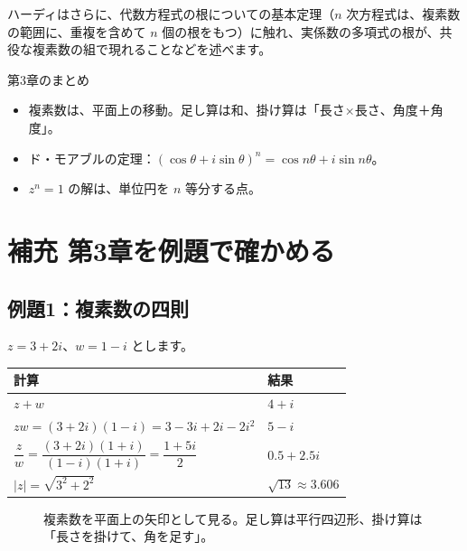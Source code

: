 \documentclass[a4paper,11pt,openany]{ltjsbook}
\begin{document}
ハーディはさらに、代数方程式の根についての基本定理（$n$ 次方程式は、複素数の範囲に、重複を含めて $n$ 個の根をもつ）に触れ、実係数の多項式の根が、共役な複素数の組で現れることなどを述べます。

\begin{pointbox}{第3章のまとめ}
\begin{itemize}[leftmargin=1.5em]
\item 複素数は、平面上の移動。足し算は和、掛け算は「長さ×長さ、角度＋角度」。
\item ド・モアブルの定理：$(\cos\theta+i\sin\theta)^n=\cos n\theta+i\sin n\theta$。
\item $z^n=1$ の解は、単位円を $n$ 等分する点。
\end{itemize}
\end{pointbox}

\section{補充 第3章を例題で確かめる}

\subsection*{例題1：複素数の四則}

$z=3+2i$、$w=1-i$ とします。

\begin{center}
\renewcommand{\arraystretch}{1.4}
\begin{tabular}{ll}
\toprule
計算 & 結果\\
\midrule
$z+w$ & $4+i$\\
$zw=(3+2i)(1-i)=3-3i+2i-2i^2$ & $5-i$\\
$\dfrac zw=\dfrac{(3+2i)(1+i)}{(1-i)(1+i)}=\dfrac{1+5i}{2}$ & $0.5+2.5i$\\
$|z|=\sqrt{3^2+2^2}$ & $\sqrt{13}\approx3.606$\\
\bottomrule
\end{tabular}
\end{center}

\begin{figure}[htbp]
\centering
{}
\caption{複素数を平面上の矢印として見る。足し算は平行四辺形、掛け算は「長さを掛けて、角を足す」。}
\end{figure}
\end{document}
